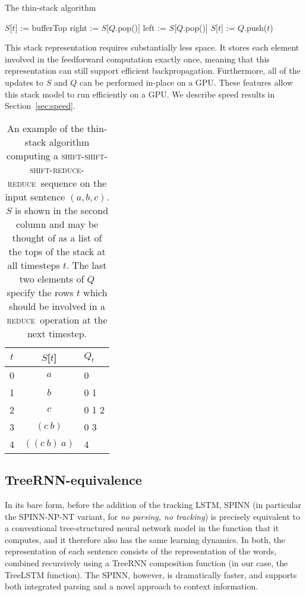\documentclass[11pt]{article}
\newcommand{\shift}{\textsc{shift}}
\newcommand{\reduce}{\textsc{reduce}}
\begin{document}
\begin{algorithm}
\caption{The thin-stack algorithm}
\label{alg:thin-stack}
\begin{algorithmic}[1]
    \If{op = \shift}
      \State $S$[$t$] := bufferTop
    \ElsIf{op = \reduce}
      \State right := $S$[$Q$.pop()]
      \State left := $S$[$Q$.pop()]
      \State $S$[$t$] := 
    \EndIf
    \State $Q$.push($t$)
  \EndFunction
\end{algorithmic}
\end{algorithm}

This stack representation requires substantially less space. It stores each element involved in the feedforward computation exactly once, meaning that this representation can still support efficient backpropagation. Furthermore, all of the updates to $S$ and $Q$ can be performed in-place on a GPU. These features allow this stack model to run efficiently on a GPU. We describe speed results in Section~\ref{sec:speed}.

\begin{table}
\centering
\begin{tabular}{c|cl}
  \toprule
  $t$ & $S$[$t$] & $Q_t$ \\
  \midrule
  0 & $a$ & 0 \\
  1 & $b$ & 0 1 \\
  2 & $c$ & 0 1 2 \\
  3 & $(c~b)$ & 0 3 \\
  4 & $((c~b)~a)$ & 4 \\
  \bottomrule
\end{tabular}
\caption{An example of the thin-stack algorithm computing a \shift-\shift-\shift-\reduce-\reduce~sequence on the input sentence $(a, b, c)$. $S$ is shown in the second column and may be thought of as a list of the tops of the stack at all timesteps $t$. The last two elements of $Q$ specify the rows $t$ which should be involved in a \reduce~operation at the next timestep.}
\label{tbl:thin-stack}
\end{table}

\subsection{TreeRNN-equivalence}

In its bare form, before the addition of the tracking LSTM, SPINN (in particular the SPINN-NP-NT variant, for \textit{no parsing, no tracking}) is precisely equivalent to a conventional tree-structured neural network model in the function that it computes, and it therefore also has the same learning dynamics. In both, the representation of each sentence consists of the representation of the words, combined recursively using a TreeRNN composition function (in our case, the TreeLSTM function). The SPINN, however, is dramatically faster, and supports both integrated parsing and a novel approach to context information.
\end{document}
